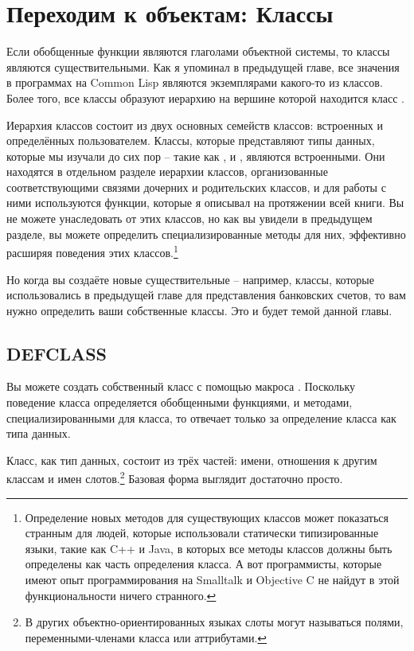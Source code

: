 \chapter{Переходим к объектам: Классы}
\label{ch:17}

Если обобщенные функции являются глаголами объектной системы, то классы являются
существительными.  Как я упоминал в предыдущей главе, все значения в программах на Common
Lisp являются экземплярами какого-то из классов.  Более того, все классы образуют иерархию
на вершине которой находится класс .

Иерархия классов состоит из двух основных семейств классов: встроенных и определённых
пользователем.  Классы, которые представляют типы данных, которые мы изучали до сих пор --
такие как ,  и , являются встроенными.  Они
находятся в отдельном разделе иерархии классов, организованные соответствующими связями
дочерних и родительских классов, и для работы с ними используются функции, которые я
описывал на протяжении всей книги.  Вы не можете унаследовать от этих классов, но как вы
увидели в предыдущем разделе, вы можете определить специализированные методы для них,
эффективно расширяя поведения этих классов.\footnote{Определение новых методов для
  существующих классов может показаться странным для людей, которые использовали
  статически типизированные языки, такие как C++ и Java, в которых все методы классов
  должны быть определены как часть определения класса.  А вот программисты, которые имеют
  опыт программирования на Smalltalk и Objective C не найдут в этой функциональности
  ничего странного.}

Но когда вы создаёте новые существительные -- например, классы, которые использовались в
предыдущей главе для представления банковских счетов, то вам нужно определить ваши
собственные классы.  Это и будет темой данной главы.

\section{DEFCLASS}

Вы можете создать собственный класс с помощью макроса .  Поскольку
поведение класса определяется обобщенными функциями, и методами, специализированными для
класса, то  отвечает только за определение класса как типа данных.

Класс, как тип данных, состоит из трёх частей: имени, отношения к другим классам и имен
слотов.\footnote{В других объектно-ориентированных языках слоты могут называться полями,
переменными-членами класса или аттрибутами.}  Базовая форма  выглядит
достаточно просто.

